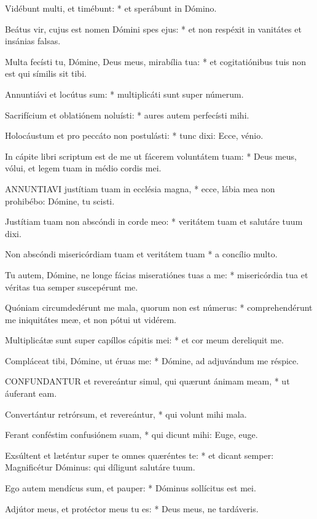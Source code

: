 Vidébunt multi, et timébunt: * et sperábunt in Dómino.

Beátus vir, cujus est nomen Dómini spes ejus: * et non respéxit in vanitátes et insánias falsas.

Multa fecísti tu, Dómine, Deus meus, mirabília tua: * et cogitatiónibus tuis non est qui símilis sit tibi.

Annuntiávi et locútus sum: * multiplicáti sunt super númerum.

Sacrifícium et oblatiónem noluísti: * aures autem perfecísti mihi.

Holocáustum et pro peccáto non postulásti: * tunc dixi: Ecce, vénio.

In cápite libri scriptum est de me ut fácerem voluntátem tuam: * Deus meus, vólui, et legem tuam in médio cordis mei.


\lettrine[lines=2]{A}{NNUNTIAVI} justítiam tuam in ecclésia magna, * ecce, lábia mea non prohibébo: Dómine, tu scisti.

Justítiam tuam non abscóndi in corde meo: * veritátem tuam et salutáre tuum dixi.

Non abscóndi misericórdiam tuam et veritátem tuam * a concílio multo.

Tu autem, Dómine, ne longe fácias miseratiónes tuas a me: * misericórdia tua et véritas tua semper suscepérunt me.

Quóniam circumdedérunt me mala, quorum non est númerus: * comprehendérunt me iniquitátes meæ, et non pótui ut vidérem.

Multiplicátæ sunt super capíllos cápitis mei: * et cor meum dereliquit me.

Compláceat tibi, Dómine, ut éruas me: * Dómine, ad adjuvándum me réspice.


\lettrine[lines=2]{C}{ONFUNDANTUR} et revereántur simul, qui quærunt ánimam meam, * ut áuferant eam.

Convertántur retrórsum, et revereántur, * qui volunt mihi mala.

Ferant conféstim confusiónem suam, * qui dicunt mihi: Euge, euge.

Exsúltent et læténtur super te omnes quæréntes te: * et dicant semper: Magnificétur Dóminus: qui díligunt salutáre tuum.

Ego autem mendícus sum, et pauper: * Dóminus sollícitus est mei.

Adjútor meus, et protéctor meus tu es: * Deus meus, ne tardáveris.

